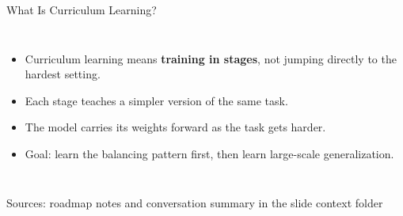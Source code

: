 \documentclass[10pt,aspectratio=169]{beamer}
\begin{document}
\begin{frame}{What Is Curriculum Learning?}
  \begin{columns}[T,onlytextwidth]
      \centering
      \begin{itemize}
        \item Curriculum learning means \textbf{training in stages}, not jumping directly to the hardest setting.
        \item Each stage teaches a simpler version of the same task.
        \item The model carries its weights forward as the task gets harder.
        \item Goal: learn the balancing pattern first, then learn large-scale generalization.
      \end{itemize}
  \end{columns}
  \vspace{0.2em}
  {\tiny Sources: roadmap notes and conversation summary in the slide context folder}
\end{frame}
\end{document}
